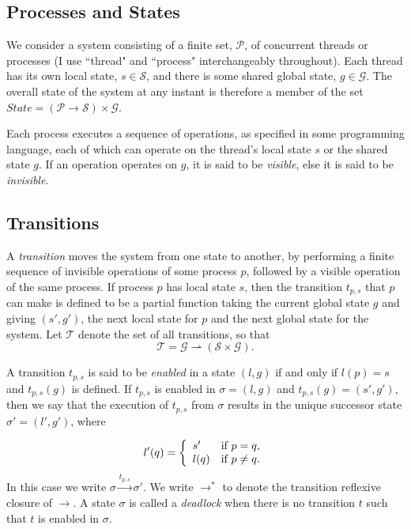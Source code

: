 \documentclass[12pt,a4paper,twoside,openright]{report}
\begin{document}
\subsection{Processes and States}
We consider a system consisting of a finite set, $\mathcal{P}$,
of concurrent threads or processes (I use ``thread" and
``process" interchangeably throughout).
Each thread has its own local state, $s \in \mathcal{S}$, and there
is some shared global state, $g \in \mathcal{G}$. The overall
state of the system at any instant is therefore a member of the set
$ State = (\mathcal{P} \to \mathcal{S}) \times \mathcal{G} $.

Each process executes a sequence of operations, as
specified in some programming language, each of which can
operate on the thread's local state $s$ or the shared
state $g$. If an operation
operates on $g$, it is said to be \emph{visible}, else it is said to be
\emph{invisible}.

\subsection{Transitions}
A \emph{transition} moves the system from one state to another,
by performing a finite sequence of invisible operations of some
process $p$, followed by a visible operation of the same process.
If process $p$ has local state $s$, then the transition $t_{p,s}$
that $p$ can make is defined to be a partial function taking the current
global state $g$ and giving $(s', g')$, the next local state for $p$
and the next global state for the system. Let $\mathcal{T}$ denote the
set of all transitions, so that
	\[\mathcal{T} = \mathcal{G} \rightharpoonup
				(\mathcal{S} \times \mathcal{G}).\]

A transition $t_{p,s}$ is said to be \emph{enabled} in a state
$(l, g)$ if and only if $l(p) = s$ and $t_{p,s}(g)$ is defined.
If $t_{p,s}$ is enabled in $\sigma = (l, g)$ and 
$t_{p,s}(g) = (s', g')$, then we say that the
execution of $t_{p,s}$ from $\sigma$ results in the unique successor
state $\sigma' = (l', g')$, where

\[
	l'(q) = \left\{\begin{array}{lr}
				s' & \textmd{if } p = q, \\
				l(q) &\textmd{if } p \neq q.
			\end{array} \right.
\]
In this case we write $\sigma \xrightarrow{t_{p,s}} \sigma'$.
We write $\longrightarrow^*$ to denote the transition reflexive
closure of $\longrightarrow$.
A state $\sigma$ is called a \emph{deadlock} when there is no transition
$t$ such that $t$ is enabled in $\sigma$.
\end{document}
